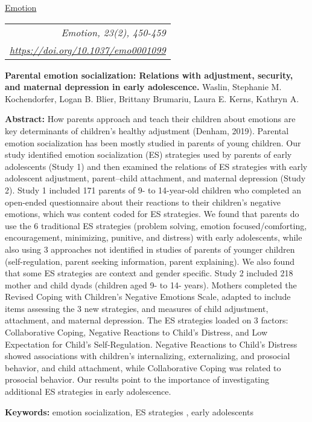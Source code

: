 \documentclass{eclab-beamer}
\begin{document}
\begin{frame}[allowframebreaks]{\color{black} \normalsize{\ul{Emotion}} \hfill
\begin{tabular}{r}
\textit{Emotion, 23(2), 450-459}\\
\href{https://doi.org/10.1037/emo0001099}{\color{blue} \footnotesize{\ul{\textit{https://doi.org/10.1037/emo0001099}}}}
\end{tabular}}

\textbf{\Large{Parental emotion socialization: Relations with adjustment, security, and maternal depression in early adolescence.}}
\vspace{1mm}
Waslin, Stephanie M. Kochendorfer, Logan B. Blier, Brittany Brumariu, Laura E. Kerns, Kathryn A.

\hspace*{\fill}


\textbf{Abstract:}
How parents approach and teach their children about emotions are key determinants of children’s healthy adjustment (Denham, 2019). Parental emotion socialization has been mostly studied in parents of young children. Our study identified emotion socialization (ES) strategies used by parents of early adolescents (Study 1) and then examined the relations of ES strategies with early adolescent adjustment, parent–child attachment, and maternal depression (Study 2). Study 1 included 171 parents of 9- to 14-year-old children who completed an open-ended questionnaire about their reactions to their children’s negative emotions, which was content coded for ES strategies. We found that parents do use the 6 traditional ES strategies (problem solving, emotion focused/comforting, encouragement, minimizing, punitive, and distress) with early adolescents, while also using 3 approaches not identified in studies of parents of younger children (self-regulation, parent seeking information, parent explaining). We also found that some ES strategies are context and gender specific. Study 2 included 218 mother and child dyads (children aged 9- to 14- years). Mothers completed the Revised Coping with Children’s Negative Emotions Scale, adapted to include items assessing the 3 new strategies, and measures of child adjustment, attachment, and maternal depression. The ES strategies loaded on 3 factors: Collaborative Coping, Negative Reactions to Child’s Distress, and Low Expectation for Child’s Self-Regulation. Negative Reactions to Child’s Distress showed associations with children’s internalizing, externalizing, and prosocial behavior, and child attachment, while Collaborative Coping was related to prosocial behavior. Our results point to the importance of investigating additional ES strategies in early adolescence.

\textbf{Keywords:} emotion socialization, ES strategies , early adolescents
\end{frame}
\end{document}
